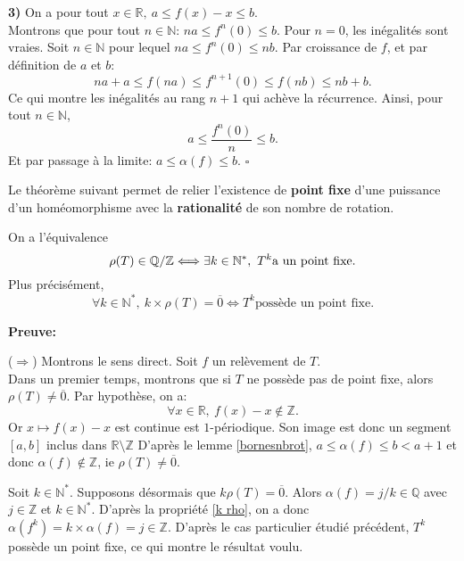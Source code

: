 	\par\textbf{3) }On a pour tout $x \in \mathbb{R},\ a \leq f(x) - x \leq b$.\\ Montrons que pour tout $n \in \mathbb{N}$: $n a \leq f^n(0) \leq b$.
	Pour $n=0$, les inégalités sont vraies. Soit $n\in \mathbb{N}$ pour lequel $na \leq f^n(0) \leq nb$. Par croissance de $f$, et par définition de $a$ et $b$:
	$$na+a \leq f(na)\leq f^{n+1}(0)\leq f(nb) \leq nb +b.$$
	Ce qui montre les inégalités au rang $n+1$ qui achève la récurrence.
	Ainsi, pour tout $n \in \mathbb{N}$,
	$$a\leq \frac{f^n(0)}{n}\leq b.$$
	Et par passage à la limite: $a\leq \alpha(f)\leq b$. \hfill $\square$ \\









\par Le théorème suivant permet de relier l'existence de \textbf{point fixe} d'une puissance d'un homéomorphisme avec la \textbf{rationalité} de son nombre de rotation.


\begin{theorem}\label{equivrationnel}
	On a l'équivalence $$\rho(T) \in \mathbb{Q}/\mathbb{Z} \Longleftrightarrow \exists k \in \mathbb{N}^*,\ T^k \text{a un point fixe.}$$
	 Plus précisément,
	 $$\forall k \in \mathbb{N}^*,\ k \times \rho(T)=\overline{0} \Longleftrightarrow T^k \text{possède un point fixe.}$$
\end{theorem}

	\textbf{Preuve:}
	\par($\Rightarrow$) Montrons le sens direct. Soit $f$ un relèvement de $T$.\\
	Dans un premier temps, montrons que si $T$ ne possède pas de point fixe, alors $\rho(T) \neq \overline{0}$. Par hypothèse, on a: $$ \forall x \in \mathbb{R},\ f(x)-x \notin \mathbb{Z}.$$
	Or $x\mapsto f(x) - x$ est continue est $1$-périodique. Son image est donc un segment $[a,b]$ inclus dans $\mathbb{R} \setminus \mathbb{Z}$
	D'après le lemme \ref{bornesnbrot}, $a \leq \alpha(f) \leq b < a+1$ et donc $\alpha(f) \notin \mathbb{Z}$, ie $\rho(T) \neq \overline{0}$.\\
	\par Soit $k\in \mathbb{N}^*$. Supposons désormais que $k \rho(T)= \overline{0}$. Alors $\alpha(f) = j/k \in \mathbb{Q}$ avec $j \in \mathbb{Z}$ et $k \in \mathbb{N}^*$. D'après la propriété \ref{k rho}, on a donc $\alpha(f^k)=k \times \alpha(f)= j \in \mathbb{Z}$.
	D'après le cas particulier étudié précédent, $T^k$ possède un point fixe, ce qui montre le résultat voulu.\\


